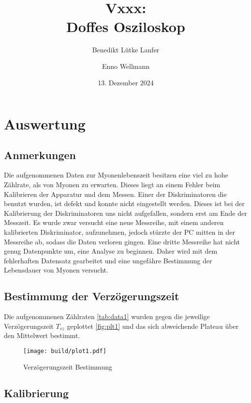 

\title{Vxxx:\\ Doffes Osziloskop}
\author{Benedikt Lütke Lanfer \and Enno Wellmann}
\date{13. Dezember 2024}
\publishers{TU Dortmund – Fakultät Physik}



\tableofcontents
\newpage



\section{Auswertung}
\subsection{Anmerkungen}
Die aufgenommenen Daten zur Myonenlebenszeit besitzen eine viel zu hohe Zählrate, als von Myonen zu erwarten.
Dieses liegt an einem Fehler beim Kalibrieren der Apparatur und dem Messen. 
Einer der Diskriminatoren die benutzt wurden, ist defekt und konnte nicht eingestellt werden. 
Dieses ist bei der Kalibrierung der Diskriminatoren uns nicht aufgefallen, sondern erst am Ende der Messzeit. 
Es wurde zwar versucht eine neue Messreihe, mit einem anderen kalibrierten Diskriminator, aufzunehmen, 
jedoch stürzte der PC mitten in der Messreihe ab, sodass die Daten verloren gingen. 
Eine dritte Messreihe hat nicht genug Datenpunkte um, eine Analyse zu beginnen. 
Daher wird mit dem fehlerhaften Datensatz gearbeitet und eine ungefähre Bestimmung der Lebensdauer von Myonen versucht.    

\subsection{Bestimmung der Verzögerungszeit}
Die aufgenommenen Zählraten \eqref{tab:data1} wurden gegen die jeweilige Verzögerungszeit $T_{vz}$ geplottet \eqref{fig:plt1} und das sich abweichende Plateau über den Mittelwert bestimmt. 

\begin{figure}[H]
	\centering
	\texttt{[image: build/plot1.pdf]}
	\caption{Verzögerungszeit Bestimmung}\label{fig:plt1}
\end{figure}

\subsection{Kalibrierung}


